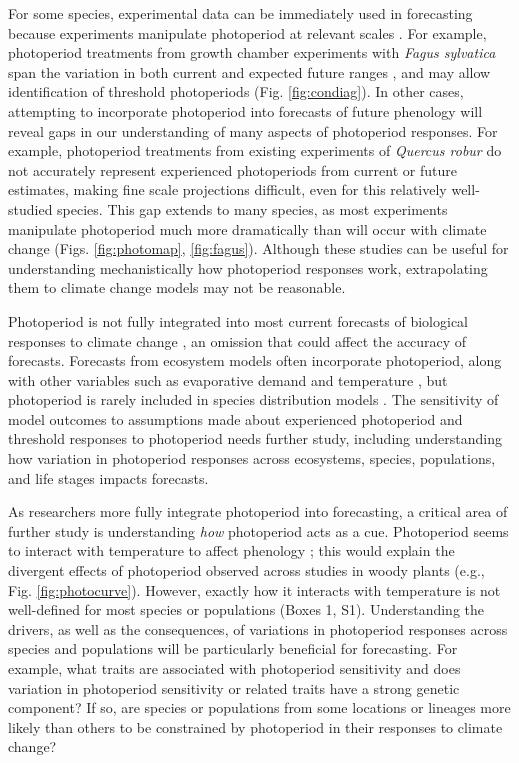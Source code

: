 \documentclass{article}
\begin{document}
\par For some species, experimental data can be immediately used in forecasting because experiments manipulate photoperiod at relevant scales \citep[e.g., ][Figs. \ref{fig:photomap}, \ref{fig:fagus} A, Table S1]{Basler:2014aa,Heide:2015aa}. For example, photoperiod treatments from growth chamber experiments with \emph{Fagus sylvatica} span the variation in both current and expected future ranges \citep[Fig. \ref{fig:fagus}, ][]{duputie2015}, and may allow identification of threshold photoperiods (Fig. \ref{fig:condiag}). In other cases, attempting to incorporate photoperiod into forecasts of future phenology will reveal gaps in our understanding of many aspects of photoperiod responses. For example, photoperiod treatments from existing experiments of \emph{Quercus robur} do not accurately represent experienced photoperiods from current or future estimates, making fine scale projections difficult, even for this relatively well-studied species. This gap extends to many species, as most experiments manipulate photoperiod much more dramatically than will occur with climate change (Figs. \ref{fig:photomap}, \ref{fig:fagus}). Although these studies can be useful for understanding mechanistically how photoperiod responses work, extrapolating them to climate change models may not be reasonable.

\par Photoperiod is not fully integrated into most current forecasts of biological responses to climate change \citep[but see][]{tobin2008}, an omission that could affect the accuracy of forecasts. Forecasts from ecosystem models often incorporate photoperiod, along with other variables such as evaporative demand and temperature \citep [e.g., ED] []{jolly2005,medvigy2013}, but photoperiod is rarely included in species distribution models \citep [e.g.,] []{morin2009,zhu2012}. The sensitivity of model outcomes to assumptions made about experienced photoperiod and threshold responses to photoperiod needs further study, including understanding how variation in photoperiod responses across ecosystems, species, populations, and life stages impacts forecasts. 

\par As researchers more fully integrate photoperiod into forecasting, a critical area of further study is understanding \emph{how} photoperiod acts as a cue. Photoperiod seems to interact with temperature to affect phenology \citep[e.g., ][]{zydlewski2014}; this would explain the divergent effects of photoperiod observed across studies in woody plants (e.g., Fig. \ref{fig:photocurve}). However, exactly how it interacts with temperature is not well-defined for most species or populations (Boxes 1, S1).  Understanding the drivers, as well as the consequences, of variations in photoperiod responses across species and populations will be particularly beneficial for forecasting. For example, what traits are associated with photoperiod sensitivity and does variation in photoperiod sensitivity or related traits have a strong genetic component? If so, are species or populations from some locations or lineages more likely than others to be constrained by photoperiod in their responses to climate change?
\end{document}
